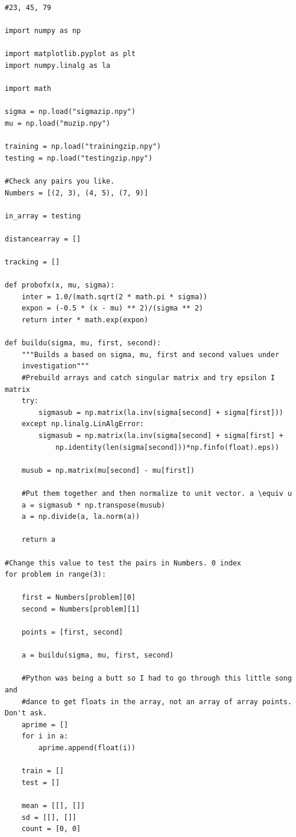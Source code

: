 \documentclass[paper=a4, fontsize=11pt]{scrartcl} %
\numberwithin{equation}{section} %
\numberwithin{figure}{section} %
\numberwithin{table}{section} %
\theoremstyle{statement}
\begin{document}
\begin{verbatim}
#23, 45, 79

import numpy as np

import matplotlib.pyplot as plt
import numpy.linalg as la

import math

sigma = np.load("sigmazip.npy")
mu = np.load("muzip.npy")

training = np.load("trainingzip.npy")
testing = np.load("testingzip.npy")

#Check any pairs you like.
Numbers = [(2, 3), (4, 5), (7, 9)]

in_array = testing

distancearray = []

tracking = []

def probofx(x, mu, sigma):
    inter = 1.0/(math.sqrt(2 * math.pi * sigma))
    expon = (-0.5 * (x - mu) ** 2)/(sigma ** 2)
    return inter * math.exp(expon)

def buildu(sigma, mu, first, second):
    """Builds a based on sigma, mu, first and second values under 
    investigation"""
    #Prebuild arrays and catch singular matrix and try epsilon I matrix
    try:
        sigmasub = np.matrix(la.inv(sigma[second] + sigma[first]))
    except np.linalg.LinAlgError:
        sigmasub = np.matrix(la.inv(sigma[second] + sigma[first] + 
            np.identity(len(sigma[second]))*np.finfo(float).eps))
    
    musub = np.matrix(mu[second] - mu[first])
    
    #Put them together and then normalize to unit vector. a \equiv u
    a = sigmasub * np.transpose(musub)    
    a = np.divide(a, la.norm(a))
    
    return a

#Change this value to test the pairs in Numbers. 0 index
for problem in range(3):

    first = Numbers[problem][0]
    second = Numbers[problem][1]
    
    points = [first, second]
            
    a = buildu(sigma, mu, first, second)
    
    #Python was being a butt so I had to go through this little song and 
    #dance to get floats in the array, not an array of array points. Don't ask.
    aprime = []
    for i in a:
        aprime.append(float(i))
    
    train = []
    test = []
    
    mean = [[], []]
    sd = [[], []]
    count = [0, 0]
    

\end{verbatim}
\end{document}
